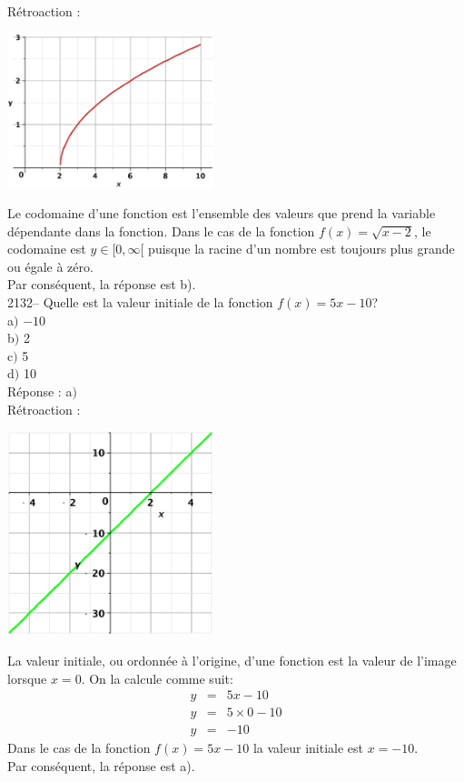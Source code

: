 \documentclass[letterpaper, 12pt]{article}
\begin{document}
R\'etroaction :
\begin{center}
 \includegraphics[width=6cm,bb=20 147 575 644]{Q2131.eps}
\end{center}
Le codomaine d'une fonction est l'ensemble des valeurs que prend la variable d\'ependante dans la fonction. Dans le cas de la fonction $f(x)=\sqrt{x-2}$, le codomaine est $y\in[0,\infty$[ puisque la racine d'un nombre est toujours plus grande ou \'egale \`a z\'ero.\\
Par cons\'equent, la r\'eponse est b).\\

2132-- Quelle est la valeur initiale de la fonction $f(x)=5x-10$?\\

a$)$ $-10$\\
b$)$ 2\\
c$)$ 5\\
d$)$ 10\\

R\'eponse : a$)$\\

R\'etroaction :
\begin{center}
 \includegraphics[width=6cm,bb=20 118 575 673]{Q2132.eps}
\end{center}
La valeur initiale, ou ordonn\'ee \`a l'origine, d'une fonction est la valeur de l'image lorsque $x=0$. On la calcule comme suit:
\begin{eqnarray*}
 y&=&5x-10\\
y&=&5\times 0 -10\\
y&=&-10
\end{eqnarray*}
Dans le cas de la fonction $f(x)=5x-10$ la valeur initiale est $x=-10$.\\
Par cons\'equent, la r\'eponse est a).\\
\end{document}

